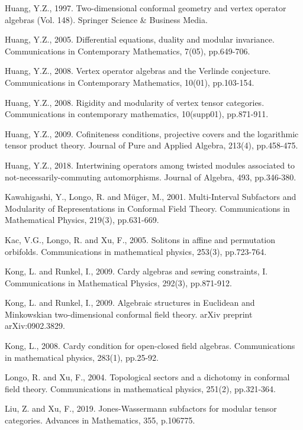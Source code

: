 \documentclass[11pt,b5paper,notitlepage]{article}
\theoremstyle{definition}
\theoremstyle{plain}
\numberwithin{equation}{subsection}
\begin{document}
\begin{thebibliography}{999999}
Huang, Y.Z., 1997. Two-dimensional conformal geometry and vertex operator algebras (Vol. 148). Springer Science \& Business Media.

Huang, Y.Z., 2005. Differential equations, duality and modular invariance. Communications in Contemporary Mathematics, 7(05), pp.649-706.


Huang, Y.Z., 2008. Vertex operator algebras and the Verlinde conjecture. Communications in Contemporary Mathematics, 10(01), pp.103-154.

Huang, Y.Z., 2008. Rigidity and modularity of vertex tensor categories. Communications in contemporary mathematics, 10(supp01), pp.871-911.

Huang, Y.Z., 2009. Cofiniteness conditions, projective covers and the logarithmic tensor product theory. Journal of Pure and Applied Algebra, 213(4), pp.458-475.



Huang, Y.Z., 2018. Intertwining operators among twisted modules associated to not-necessarily-commuting automorphisms. Journal of Algebra, 493, pp.346-380.

Kawahigashi, Y., Longo, R. and Müger, M., 2001. Multi-Interval Subfactors and Modularity of Representations in Conformal Field Theory. Communications in Mathematical Physics, 219(3), pp.631-669.

Kac, V.G., Longo, R. and Xu, F., 2005. Solitons in affine and permutation orbifolds. Communications in mathematical physics, 253(3), pp.723-764.

Kong, L. and Runkel, I., 2009. Cardy algebras and sewing constraints, I. Communications in Mathematical Physics, 292(3), pp.871-912.

Kong, L. and Runkel, I., 2009. Algebraic structures in Euclidean and Minkowskian two-dimensional conformal field theory. arXiv preprint arXiv:0902.3829.


Kong, L., 2008. Cardy condition for open-closed field algebras. Communications in mathematical physics, 283(1), pp.25-92.


Longo, R. and Xu, F., 2004. Topological sectors and a dichotomy in conformal field theory. Communications in mathematical physics, 251(2), pp.321-364.	

Liu, Z. and Xu, F., 2019. Jones-Wassermann subfactors for modular tensor categories. Advances in Mathematics, 355, p.106775.	



\end{thebibliography}
\end{document}
